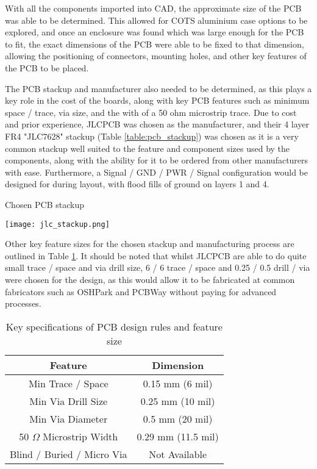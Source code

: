 With all the components imported into CAD, the approximate size of the PCB was able to be determined. This allowed for COTS aluminium case options to be explored, and once an enclosure was found which was large enough for the PCB to fit, the exact dimensions of the PCB were able to be fixed to that dimension, allowing the positioning of connectors, mounting holes, and other key features of the PCB to be placed. 

The PCB stackup and manufacturer also needed to be determined, as this plays a key role in the cost of the boards, along with key PCB features such as minimum space / trace, via size, and the with of a 50 ohm microstrip trace. Due to cost and prior experience, JLCPCB was chosen as the manufacturer, and their 4 layer FR4 "JLC7628" stackup (Table \ref{table:pcb_stackup}) was chosen as it is a very common stackup well suited to the feature and component sizes used by the components, along with the ability for it to be ordered from other manufacturers with ease. Furthermore, a Signal / GND / PWR / Signal configuration would be designed for during layout, with flood fills of ground on layers 1 and 4. 

\begin{table}[h!]
	\centering
	\caption{Chosen PCB stackup}
	\texttt{[image: jlc\_stackup.png]}
	\label{table:pcb_stackup}
\end{table}

Other key feature sizes for the chosen stackup and manufacturing process are outlined in Table \ref{table:pcb_specs}. It should be noted that whilst JLCPCB are able to do quite small trace / space and via drill size, 6 / 6 trace / space and 0.25 / 0.5 drill / via were chosen for the design, as this would allow it to be fabricated at common fabricators such as OSHPark and PCBWay without paying for advanced processes. 
\begin{table}[h!]
	\caption{Key specifications of PCB design rules and feature size}
	\label{table:pcb_specs}
	\centering
	\begin{tabular}{|c|c|}
		\hline
		\textbf{Feature}                          & \textbf{Dimension} \\ \hline
		Min Trace / Space                         & 0.15 mm (6 mil)   \\ \hline
		Min Via Drill Size                        & 0.25 mm (10 mil)     \\ \hline
		Min Via Diameter                          & 0.5 mm (20 mil)   \\ \hline
		50 $\Omega$ Microstrip Width              & 0.29 mm (11.5 mil) \\ \hline
		Blind / Buried / Micro Via                & Not Available \\ \hline
	\end{tabular}
\end{table} 


